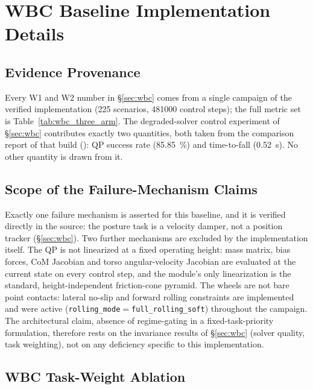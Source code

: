 \documentclass[conference]{IEEEtran}
\begin{document}
\section{WBC Baseline Implementation Details}
\label{sec:wbc_supp}

\subsection{Evidence Provenance}

Every W1 and W2 number in \S\ref{sec:wbc} comes from a single campaign of the
verified implementation (225 scenarios, \num{481000} control steps); the full
metric set is Table~\ref{tab:wbc_three_arm}. The degraded-solver control
experiment of \S\ref{sec:wbc} contributes exactly two quantities, both taken from
the comparison report of that build
(): QP success rate
(\SI{85.85}{\percent}) and time-to-fall (\SI{0.52}{s}). No other quantity is
drawn from it.

\subsection{Scope of the Failure-Mechanism Claims}

Exactly one failure mechanism is asserted for this baseline, and it is verified
directly in the source: the posture task is a velocity damper, not a position
tracker (\S\ref{sec:wbc}). Two further mechanisms
are excluded by the implementation itself. The QP is not linearized at a fixed operating height: mass matrix, bias forces, CoM Jacobian and torso
angular-velocity Jacobian are evaluated at the current state on every control
step, and the module's only linearization is the standard, height-independent
friction-cone pyramid. The wheels are not bare point contacts: lateral no-slip
and forward rolling constraints are implemented and were active
(\texttt{rolling\_mode}${=}$\texttt{full\_rolling\_soft}) throughout the
campaign. The architectural claim, absence of regime-gating in a fixed-task-priority formulation, therefore rests on the invariance results of
\S\ref{sec:wbc} (solver quality, task weighting), not on any deficiency specific
to this implementation.

\subsection{WBC Task-Weight Ablation}
\end{document}
